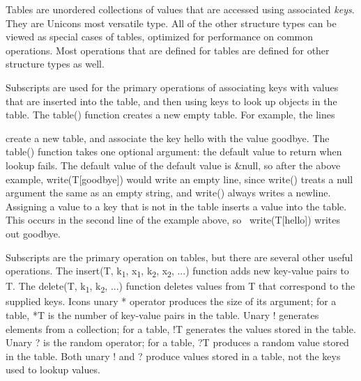 Tables are unordered collections of values that
are accessed using associated \textit{keys}. They are Unicon{\textquotesingle}s most versatile
type. All of the other structure types can be viewed as special cases
of tables, optimized for performance on common operations. Most
operations that are defined for tables are defined for other structure
types as well.

Subscripts are used for the primary operations of
associating keys with values that are inserted into the table, and then
using keys to look up objects in the table. The \textsf{table()}
function creates a new empty table. For example, the lines


\noindent
create a new table, and associate the key
\textsf{{\textquotedbl}hello{\textquotedbl}} with the value
\textsf{{\textquotedbl}goodbye{\textquotedbl}}. The \textsf{table()}
function takes one optional argument: the default value to return when lookup fails. The default value of the default value is
\textsf{\&null}, so after the above example,
\textsf{write(T[{\textquotedbl}goodbye{\textquotedbl}])} would write an
empty line, since \textsf{write()} treats a null argument the same as
an empty string, and \textsf{write()} always writes a newline.
Assigning a value to a key that is not in the table inserts a value
into the table. This occurs in the second line of the example above, so
\ \textsf{write(T[{\textquotedbl}hello{\textquotedbl}])} writes out
\textsf{{\textquotedbl}goodbye{\textquotedbl}}.

Subscripts are the primary operation on tables, but there are several
other useful operations. The \textsf{insert(T,
k}\textsf{\textsubscript{1}}\textsf{,
x}\textsf{\textsubscript{1}}\textsf{,
k}\textsf{\textsubscript{2}}\textsf{,
x}\textsf{\textsubscript{2}}\textsf{, ...)} function adds new key-value
pairs to \textsf{T}. The \textsf{delete(T,
k}\textsf{\textsubscript{1}}\textsf{,
k}\textsf{\textsubscript{2}}\textsf{, ...)} function deletes values
from \textsf{T} that correspond to the supplied keys.
Icon{\textquotesingle}s unary \textsf{*} operator produces the size of
its argument; for a table, \textsf{*T} is the
number of key-value pairs in the table. Unary \textsf{!} generates
elements from a collection; for a table, \textsf{!T} generates the
values stored in the table. Unary \textsf{?} is the random operator;
for a table, \textsf{?T} produces a random value stored in the table.
Both unary \textsf{!} and \textsf{?} produce values stored in a table,
not the keys used to lookup values.


